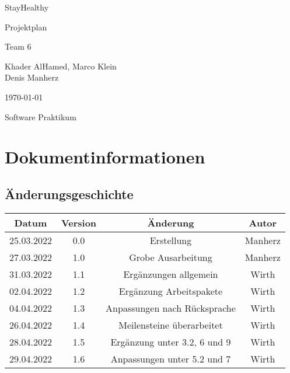 \documentclass[12pt,a4paper,onecolumn]{article}
\newcommand\titleofdoc{StayHealthy} %
\newcommand\GroupName{Team 6} %
\begin{document}
\begin{titlepage}
   \begin{center}
        \vspace*{4cm} %

        \Huge{\titleofdoc} 

        \vspace{0.5cm}
        \LARGE{Projektplan}
            
        \vspace{3 cm}
        \Large{\GroupName}
       
        \vspace{0.25cm}
        \large{Khader AlHamed, Marco Klein\\Denis Manherz}
       
        \vspace{3 cm}
        \Large{\today}%
        
        \vspace{0.25 cm}
        \Large{Software Praktikum}
       

       \vfill
    \end{center}
\end{titlepage}
\setcounter{page}{2}
\tableofcontents
\newpage

\section{Dokumentinformationen} 
\subsection{Änderungsgeschichte}
\begin{center}
\begin{tabular}{ |c|c|c|c| } 
 \hline
 Datum & Version & Änderung & Autor\\ 
 \hline
 25.03.2022 & 0.0 & Erstellung & Manherz \\ 
 \hline
 27.03.2022 & 1.0 & Grobe Ausarbeitung & Manherz\\
 \hline
 31.03.2022 & 1.1 & Ergänzungen allgemein & Wirth\\
 \hline
 02.04.2022 & 1.2 & Ergänzung Arbeitspakete & Wirth\\
 \hline
 04.04.2022 & 1.3 & Anpassungen nach Rücksprache & Wirth\\
 \hline
 26.04.2022 & 1.4 & Meilensteine überarbeitet & Wirth\\
 \hline
 28.04.2022 & 1.5 & Ergänzung unter 3.2, 6 und 9 & Wirth\\
 \hline
 29.04.2022 & 1.6 & Anpassungen unter 5.2 und 7 & Wirth\\
 \hline
\end{tabular}
\end{center}
\end{document}
